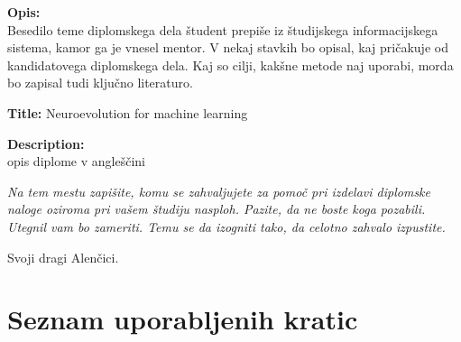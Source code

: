 \documentclass[a4paper,12pt,openright]{book}
\newcommand{\clearemptydoublepage}{\newpage{\pagestyle{empty}\cleardoublepage}}
\begin{document}
    \bigskip
    \noindent\textbf{Opis:}\\
    Besedilo teme diplomskega dela študent prepiše iz študijskega informacijskega sistema, kamor ga je vnesel mentor.
    V nekaj stavkih bo opisal, kaj pričakuje od kandidatovega diplomskega dela.
    Kaj so cilji, kakšne metode naj uporabi, morda bo zapisal tudi ključno literaturo.

    \bigskip
    \noindent\textbf{Title:} Neuroevolution for machine learning

    \bigskip
    \noindent\textbf{Description:}\\
    opis diplome v angleščini

    \vfill



    \vspace{2cm}

    \clearemptydoublepage

    \thispagestyle{empty}\mbox{}\vfill\null\it%
    \noindent
    Na tem mestu zapišite, komu se zahvaljujete za pomoč pri izdelavi diplomske naloge oziroma pri vašem študiju nasploh. Pazite, da ne boste koga pozabili. Utegnil vam bo zameriti. Temu se da izogniti tako, da celotno zahvalo izpustite.
    \rm\normalfont

    \clearemptydoublepage

    \thispagestyle{empty}\mbox{}{\textheight}\mbox{}\hfill\begin{minipage}{0.55\textwidth}%
                                                                        Svoji dragi Alenčici.
                                                                        \normalfont
    \end{minipage}

    \clearemptydoublepage


    \pagestyle{empty}
    \def\thepage{}%
    \tableofcontents{}


    \clearemptydoublepage


    \chapter*{Seznam uporabljenih kratic}
\end{document}
